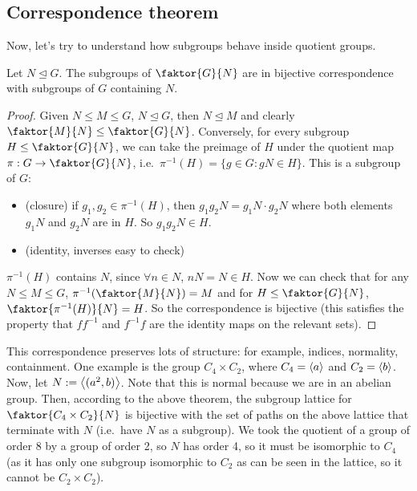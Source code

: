 \subsection{Correspondence theorem}
Now, let's try to understand how subgroups behave inside quotient groups.
\begin{theorem}
	Let \(N \trianglelefteq G\).
	The subgroups of \(\faktor{G}{N}\) are in bijective correspondence with subgroups of \(G\) containing \(N\).
\end{theorem}
\begin{proof}
	Given \(N \leq M \leq G\), \(N \trianglelefteq G\), then \(N \trianglelefteq M\) and clearly \(\faktor{M}{N} \leq \faktor{G}{N}\).
	Conversely, for every subgroup \(H \leq \faktor{G}{N}\), we can take the preimage of \(H\) under the quotient map \(\pi : G \to \faktor{G}{N}\), i.e.\ \(\pi^{-1}(H) = \{ g \in G : gN \in H \}\).
	This is a subgroup of \(G\):
	\begin{itemize}
		\item (closure) if \(g_1, g_2 \in \pi^{-1}(H)\), then \(g_1g_2N = g_1N\cdot g_2N\) where both elements \(g_1N\) and \(g_2N\) are in \(H\).
		      So \(g_1g_2N \in H\).
		\item (identity, inverses easy to check)
	\end{itemize}
	\(\pi^{-1}(H)\) contains \(N\), since \(\forall n \in N\), \(nN = N \in H\).
	Now we can check that for any \(N \leq M \leq G\), \(\pi^{-1}(\faktor{M}{N}) = M\) and for \(H \leq \faktor{G}{N}\), \(\faktor{\pi^{-1}(H)}{N} = H\).
	So the correspondence is bijective (this satisfies the property that \(ff^{-1}\) and \(f^{-1}f\) are the identity maps on the relevant sets).
\end{proof}
This correspondence preserves lots of structure: for example, indices, normality, containment.
One example is the group \(C_4 \times C_2\), where \(C_4 = \left\langle{} a \right\rangle\) and \(C_2 = \left\langle{} b \right\rangle\).
Now, let \(N := \left\langle{} (a^2, b) \right\rangle\).
Note that this is normal because we are in an abelian group.
Then, according to the above theorem, the subgroup lattice for \(\faktor{C_4 \times C_2}{N}\) is bijective with the set of paths on the above lattice that terminate with \(N\) (i.e.\ have \(N\) as a subgroup).
We took the quotient of a group of order 8 by a group of order 2, so \(N\) has order 4, so it must be isomorphic to \(C_4\) (as it has only one subgroup isomorphic to \(C_2\) as can be seen in the lattice, so it cannot be \(C_2 \times C_2\)).


